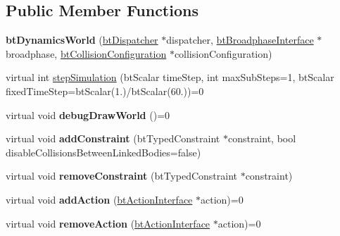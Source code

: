 \subsection*{Public Member Functions}
\begin{DoxyCompactItemize}
\item 
\hypertarget{classbt_dynamics_world_ade9becb7e4f919d56a8c261baf560896}{{\bfseries bt\+Dynamics\+World} (\hyperlink{classbt_dispatcher}{bt\+Dispatcher} $\ast$dispatcher, \hyperlink{classbt_broadphase_interface}{bt\+Broadphase\+Interface} $\ast$broadphase, \hyperlink{classbt_collision_configuration}{bt\+Collision\+Configuration} $\ast$collision\+Configuration)}\label{classbt_dynamics_world_ade9becb7e4f919d56a8c261baf560896}

\item 
virtual int \hyperlink{classbt_dynamics_world_a5ab26a0d6e8b2b21fbde2ed8f8dd6294}{step\+Simulation} (bt\+Scalar time\+Step, int max\+Sub\+Steps=1, bt\+Scalar fixed\+Time\+Step=bt\+Scalar(1.)/bt\+Scalar(60.))=0
\item 
\hypertarget{classbt_dynamics_world_a392b087f91a91a9b46a63ac790f72b80}{virtual void {\bfseries debug\+Draw\+World} ()=0}\label{classbt_dynamics_world_a392b087f91a91a9b46a63ac790f72b80}

\item 
\hypertarget{classbt_dynamics_world_aafdfed3d693792d9280251ff8b9ae0d8}{virtual void {\bfseries add\+Constraint} (bt\+Typed\+Constraint $\ast$constraint, bool disable\+Collisions\+Between\+Linked\+Bodies=false)}\label{classbt_dynamics_world_aafdfed3d693792d9280251ff8b9ae0d8}

\item 
\hypertarget{classbt_dynamics_world_a89e0f17523fc4d65428545644f7e2515}{virtual void {\bfseries remove\+Constraint} (bt\+Typed\+Constraint $\ast$constraint)}\label{classbt_dynamics_world_a89e0f17523fc4d65428545644f7e2515}

\item 
\hypertarget{classbt_dynamics_world_ad8eea68a1bcbe55e6520aa3dee44a519}{virtual void {\bfseries add\+Action} (\hyperlink{classbt_action_interface}{bt\+Action\+Interface} $\ast$action)=0}\label{classbt_dynamics_world_ad8eea68a1bcbe55e6520aa3dee44a519}

\item 
\hypertarget{classbt_dynamics_world_a391b665d8ceae4d793fa213c87b5461f}{virtual void {\bfseries remove\+Action} (\hyperlink{classbt_action_interface}{bt\+Action\+Interface} $\ast$action)=0}\label{classbt_dynamics_world_a391b665d8ceae4d793fa213c87b5461f}


\end{DoxyCompactItemize}
